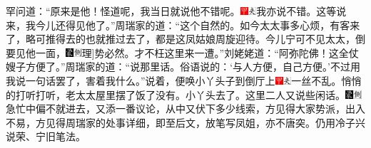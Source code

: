 罕问道：“原来是他！怪道呢，我当日就说他不错呢。{\includegraphics[width=3mm]{../Images/00002}\includegraphics[width=3mm]{../Images/00012}\footnotesize \kaishu 我亦说不错。}这等说来，我今儿还得见他了。”周瑞家的道：“这个自然的。如今太太事多心烦，有客来了，略可推得去的也就推过去了，都是这凤姑娘周旋迎待。今儿宁可不见太太，倒要见他一面，{\includegraphics[width=3mm]{../Images/00006}\includegraphics[width=3mm]{../Images/00011}\footnotesize \kaishu {(礼)}{[}理{]}势必然。}才不枉这里来一遭。”刘姥姥道：“阿弥陀佛！这全仗嫂子方便了。”周瑞家的道：“说那里话。俗语说的：‘与人方便，自己方便。’不过用我说一句话罢了，害着我什么。”说着，便唤小丫头子到倒厅上{\includegraphics[width=3mm]{../Images/00002}\includegraphics[width=3mm]{../Images/00012}\footnotesize \kaishu 一丝不乱。}悄悄的打听打听，老太太屋里摆了饭了没有。小丫头去了。这里二人又说些闲话。{\includegraphics[width=3mm]{../Images/00006}\includegraphics[width=3mm]{../Images/00011}\footnotesize \kaishu 急忙中偏不就进去，又添一番议论，从中又伏下多少线索，方见得大家势派，出入不易，方见得周瑞家的处事详细，即至后文，放笔写凤姐，亦不唐突。仍用冷子兴说荣、宁旧笔法。}

